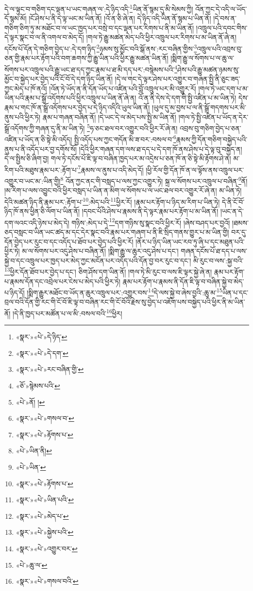 དེ་ལ་ལྟུང་བ་གཅིག་དང་ལྡན་པ་ཡང་གཞན་ལ་:དེ་ཉིད་འདི་\footnote{«སྣར་»«པེ་»དེ་ཉིད་}ཡིན་ནོ་སྙམ་དུ་མི་སེམས་ཀྱི། འོན་ཀྱང་དེ་འདི་ལ་ཡོད་དོ་སྙམ་མོ། །ངོ་ཤེས་པ་ནི་དེ་ལྟ་ཡང་མ་ཡིན་ནོ། །འོ་ན་ཅི་ཞེ་ན། དེ་ཉིད་འདི་ཡིན་ནོ་སྙམ་པ་ཡིན་ནོ། །དེ་བས་ན་གཅིག་ཅིག་ཏུ་མ་མཐོང་བ་ལ་ཡང་ཁྱད་པར་བསྲེ་བ་དང་ལྡན་པར་རིགས་པ་ནི་མ་ཡིན་ནོ། །འཁྲུལ་པའི་དབང་གིས་དེ་ལྟར་སྣང་བ་ལ་ནི་འགལ་བ་མེད་དོ། །གལ་ཏེ་རྒྱུ་མཚན་མེད་པའི་ཕྱིར་འཁྲུལ་པར་རིགས་པ་མ་ཡིན་ནོ་ཞེ་ན། དངོས་པོ་དོན་དེ་གཅིག་བྱེད་པ་:དེ་དག་ཉིད་\footnote{«སྣར་»«པེ་»དེ་དག་}ཉམས་སུ་མྱོང་བའི་སྒོ་ནས་:རང་བཞིན་གྱིས་\footnote{«སྣར་»«པེ་»རང་བཞིན་གྱི་}འཁྲུལ་པའི་འབྲས་བུ་ཅན་གྱི་རྣམ་པར་རྟོག་པའི་བག་ཆགས་ཀྱི་རྒྱུ་ཡིན་པའི་ཕྱིར་རྒྱུ་མཚན་ཡིན་ནོ། །སྨིག་རྒྱུ་ལ་སོགས་པ་ལ་ཆུ་ལ་སོགས་པར་འཁྲུལ་པའི་རྒྱུ་ཡང་ཐ་དད་ཀྱང་རྣམ་པ་ཐ་མི་དད་པར་:བསྙེམས་པའི་\footnote{«ཅོ་»སྙེམས་པའི་}ཤེས་པའི་རྒྱུ་མཚན་ཉམས་སུ་མྱོང་བ་སྐྱེད་པར་བྱེད་པའི་ངོ་བོ་དེ་དག་ཉིད་ཡིན་ནོ། །དེ་ལ་གང་དེ་ལྟར་ཤེས་པར་འགྱུར་བ་གཞན་སྤྱི་ནི་ཅུང་ཟད་ཀྱང་མེད་པ་ཁོ་ནའོ། །འོན་ཏེ་ཡོད་ན་ནི་དོན་ཡོད་པ་འཛིན་པའི་བློ་འཁྲུལ་པར་མི་འགྱུར་རོ། །གལ་ཏེ་ཡང་དག་པ་མ་ཡིན་པའི་རྣམ་པ་སྒྲོ་འདོགས་པའི་ཕྱིར་འཁྲུལ་པ་ཡིན་ནོ་ཞེ་ན། འོ་ན་ནི་དེས་དེ་དག་གི་སྤྱི་འཛིན་པ་མ་ཡིན་ཏེ། དེས་རྣམ་པ་གང་ཁོ་ན་སྒྲོ་འདོགས་པར་བྱེད་པ་དེ་ཉིད་འདིའི་ཡུལ་ཡིན་ནོ། །ཡུལ་དུ་མ་བྱས་པ་ལ་ནི་སྒྲོ་གདགས་པར་མི་ནུས་པའི་ཕྱིར་ཏེ། རྣམ་པ་གཞན་བཞིན་ནོ། །དེ་ཡང་དེ་ལ་མེད་པས་སྤྱི་མ་ཡིན་ནོ། །གལ་ཏེ་སྤྱི་འཛིན་པ་ཡོད་ན་དེར་སྒྲོ་འདོགས་ཀྱི་གཞན་དུ་ནི་མ་ཡིན་ཏེ། \footnote{«པེ་»ནོ། ། }ཧ་ཅང་ཐལ་བར་འགྱུར་བའི་ཕྱིར་རོ་ཞེ་ན། འབྲས་བུ་གཅིག་བྱེད་པ་ཅན་འཛིན་པ་ཡོད་ན་ཅི་སྟེ་མི་འདོད། སྤྱི་འདོད་པས་ཀྱང་གདོན་མི་ཟ་བར་:བསལ་བ་\footnote{«སྣར་»«པེ་»གསལ་བ་}རྣམས་ཀྱི་དོན་གཅིག་བསྐྱེད་པའི་ནུས་པ་ནི་འདོད་པར་བྱ་དགོས་སོ། །དེའི་ཕྱིར་གཞན་དག་ལས་ཐ་དད་པ་དེ་དག་ཁོ་ནས་ཤེས་པ་དེ་ལྟ་བུ་བསྐྱེད་ན། དེ་ལ་སྤྱིས་ཅི་ཞིག་བྱ། གལ་ཏེ་དངོས་པོ་ཇི་ལྟ་བ་བཞིན་ཁྱད་པར་མ་འདྲེས་པ་ཅན་ཁོ་ན་ཅི་སྟེ་མི་རྟོགས་ཤེ་ན། མ་རིག་པའི་མཐུས་རྣམ་པར་:རྟོག་པ་\footnote{«སྣར་»«པེ་»རྟོགས་པ་}རྣམས་ལ་ནུས་པ་འདི་མེད་དོ། །ཕྱི་རོལ་གྱི་དོན་ཁོ་ན་ལ་ལྟོས་ནས་འཁྲུལ་པར་འགྱུར་བ་ཡང་མ་:ཡིན་གྱི།\footnote{«པེ་»ཡིན་ནི།} འོན་ཀྱང་ནང་གི་བསླད་པ་ལས་ཀྱང་འགྱུར་ཏེ། སྐྲ་ལ་སོགས་པར་འཁྲུལ་པ་བཞིན་\footnote{«པེ་»ཡིན་}ནོ། །མ་རིག་པ་ལས་འབྱུང་བའི་ཕྱིར་བསླད་པ་ཡིན་ན་མིག་ལ་སོགས་པ་ལ་ཡང་ཐལ་བར་འགྱུར་རོ་ཞེ་ན། མ་ཡིན་ཏེ། དེའི་མཚན་ཉིད་ནི་རྣམ་པར་:རྟོག་པ་\footnote{«སྣར་»«པེ་»རྟོགས་པ་}:མེད་པའི་\footnote{«སྣར་»«པེ་»ཡིན་པའི་}ཕྱིར་རོ། །རྣམ་པར་རྟོག་པ་ཉིད་མ་རིག་པ་ཡིན་ཏེ། དེ་ནི་ངོ་བོ་ཉིད་ཁོ་ནས་ཕྱིན་ཅི་ལོག་པ་ཡིན་ནོ། །དབང་པོའི་ཤེས་པ་རྣམས་ནི་དེ་ལྟར་རྣམ་པར་རྟོག་པ་མ་ཡིན་ནོ། །ཡང་ན་དེ་དག་ལའང་འདི་ཉེས་པ་མེད་དེ། གཉིས་:མེད་པ་དེ་\footnote{«སྣར་»«པེ་»མེད་པ་}དག་གཉིས་སུ་སྣང་བའི་ཕྱིར་རོ། །ཞེས་བཤད་པར་བྱའོ། །ཐམས་ཅད་བསླང་བ་ཡིན་ཡང་ཚད་མ་དང་དེར་སྣང་བའི་རྣམ་པར་གཞག་པ་ནི་ཇི་སྲིད་གནས་གྱུར་པ་མ་ཡིན་གྱི། བར་དུ་དོན་བྱེད་པར་རུང་བ་དང་འདོད་པ་ཐོབ་པར་བྱེད་པའི་ཕྱིར་རོ། །ནོར་པ་ཉིད་ཡིན་ཡང་རབ་ཏུ་ཞི་པ་དང་མཐུན་པའི་ཕྱིར་ཏེ། མ་ལ་སོགས་པར་འདུ་ཤེས་པ་བཞིན་ནོ། །སྨིག་རྒྱུ་ལ་ཆུར་འདུ་ཤེས་པ་དང་། གཞན་དངོས་པོ་ཐ་དད་པ་ལས་སྐྱེ་བ་དང་འཁྲུལ་པར་ཁྱད་པར་མེད་ཀྱང་མངོན་པར་འདོད་པའི་དོན་བྱ་བར་རུང་བ་དང་། མི་རུང་བ་ལས་:སྐྱ་བའི་\footnote{«སྣར་»«པེ་»སྐྱེས་པའི་}ཕྱིར་དོན་ཐོབ་པར་བྱེད་པ་དང་། ཅིག་ཤོས་དག་ཡིན་ནོ། །གལ་ཏེ་མི་རུང་བ་ལས་ཇི་ལྟར་སྐྱེ་ཞེ་ན། རྣམ་པར་རྟོག་པ་རྣམས་དོན་དང་འབྲེལ་པར་ངེས་པ་མེད་པའི་ཕྱིར་ཏེ། རྣམ་པར་རྟོག་པ་རྣམས་ནི་དོན་ཇི་ལྟ་བ་བཞིན་སྐྱེ་བ་མེད་པ་ཉིད་དོ། །སྨིག་རྒྱུར་མཐོང་བ་ཡོད་ན་ཆུར་འཁྲུལ་པར་:འགྱུར་བས་\footnote{«སྣར་»«པེ་»འགྱུར་བར་}དེ་ལས་སྐྱེ་བ་ཞེས་བྱའི་:ཆུ་མ་\footnote{«པེ་»ཆུ་ལ་}ཡིན་པ་དང་བྲལ་བའི་དོན་གྱི་རང་གི་ངོ་བོ་ཇི་ལྟ་བ་བཞིན་རང་གི་ངོ་བོའི་རྗེས་སུ་བྱེད་པ་འཇོག་པས་བསྐྱེད་པའི་ཕྱིར་ནི་མ་ཡིན་ནོ། །དེ་ནི་ཁྱད་པར་མཚོན་པ་ལ་མི་:བསལ་བའི་\footnote{«སྣར་»«པེ་»གསལ་བའི་}ཕྱིར། 